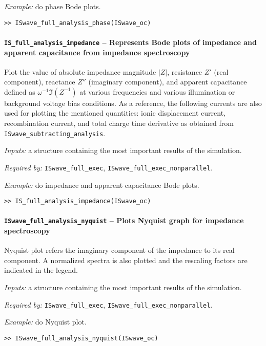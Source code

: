 	\textit{Example:} do phase Bode plots.
	\begin{lstlisting}[style=Matlab-editor]
>> ISwave_full_analysis_phase(ISwave_oc)
				\end{lstlisting}

	\paragraph{\texttt{IS\_full\_analysis\_impedance} -- Represents Bode plots of impedance and apparent capacitance from impedance spectroscopy}
	Plot the value of absolute impedance magnitude $|Z|$, resistance $Z'$ (real component), reactance $Z''$ (imaginary component), and apparent capacitance defined as $\omega^{-1}\Im(Z^{-1})$ at various frequencies and various illumination or background voltage bias conditions.
	As a reference, the following currents are also used for plotting the mentioned quantities: ionic displacement current, recombination current, and total charge time derivative as obtained from \texttt{IS\-wave\_subtracting\_analysis}.

	\textit{Inputs:} a structure containing the most important results of the simulation.

	\textit{Required by:} \texttt{IS\-wave\_full\_exec}, \texttt{IS\-wave\_full\_exec\_nonparallel}.

	\textit{Example:} do impedance and apparent capacitance Bode plots.
	\begin{lstlisting}[style=Matlab-editor]
>> IS_full_analysis_impedance(ISwave_oc)
\end{lstlisting}

	\paragraph{\texttt{IS\-wave\_full\_analysis\_nyquist} -- Plots Nyquist graph for impedance spectroscopy}
	Nyquist plot refers the imaginary component of the impedance to its real component.
	A normalized spectra is also plotted and the rescaling factors are indicated in the legend.

	\textit{Inputs:} a structure containing the most important results of the simulation.

	\textit{Required by:} \texttt{IS\-wave\_full\_exec}, \texttt{IS\-wave\_full\_exec\_nonparallel}.

	\textit{Example:} do Nyquist plot.
	\begin{lstlisting}[style=Matlab-editor]
>> ISwave_full_analysis_nyquist(ISwave_oc)
\end{lstlisting}





